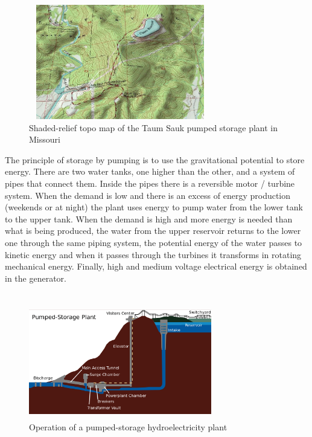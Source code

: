 \documentclass[a4paper,11 pt]{article}
\begin{document}
\begin {figure}[h]
\begin{center}
\includegraphics[width=80mm,height=50mm]{photo2.jpg}
\caption {Shaded-relief topo map of the Taum Sauk pumped storage plant in Missouri}
\end{center}
\end{figure}


The principle of storage by pumping is to use the gravitational potential to store energy. There are two water tanks, one higher than the other, and a system of pipes that connect them.  Inside the pipes there is a reversible motor / turbine system. When the demand is low and there is an excess of energy production (weekends or at night) the plant uses energy to pump water from the lower tank to the upper tank. When the demand is high and more energy is needed than what is being produced, the water from the upper reservoir returns to the lower one through the same piping system, the potential energy of the water passes to kinetic energy and when it passes through the turbines it transforms in rotating mechanical energy. Finally, high and medium voltage electrical energy is obtained in the generator.  \cite{Lewis2017} \cite{Roca2017} \\ \\


\begin {figure}[h]
\begin{center}
\includegraphics[width=80mm,height=50mm]{photo.png}
\caption {Operation of a pumped-storage hydroelectricity plant}
\end{center}
\end{figure}
\end{document}
